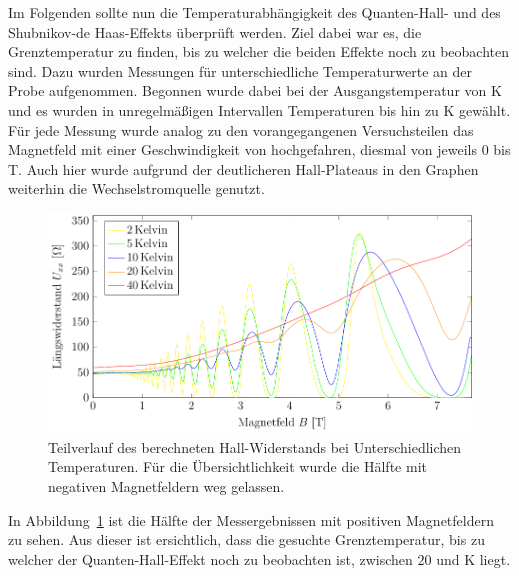 
Im Folgenden sollte nun die Temperaturabhängigkeit des Quanten-Hall- und des Shubnikov-de Haas-Effekts überprüft werden. Ziel dabei war es, die Grenztemperatur zu finden, bis zu welcher die beiden Effekte noch zu beobachten sind. 
Dazu wurden Messungen für unterschiedliche Temperaturwerte an der Probe aufgenommen. Begonnen wurde dabei bei der Ausgangstemperatur von \unit[2]{K} und es wurden in unregelmäßigen Intervallen Temperaturen bis hin zu \unit[40]{K} gewählt. Für jede Messung wurde analog zu den vorangegangenen Versuchsteilen das Magnetfeld mit einer Geschwindigkeit von  hochgefahren, diesmal von jeweils 0 bis \unit[7,7]{T}. Auch hier wurde aufgrund der deutlicheren Hall-Plateaus in den Graphen weiterhin die Wechselstromquelle genutzt.


\begin{figure}[h]
	\centering
	\includegraphics[scale=1]{graphs/temperatur/full_range.pdf}
	\caption[Hall-Widerstand unter Temperaturvariation]{
		Teilverlauf des berechneten Hall-Widerstands bei Unterschiedlichen Temperaturen. Für die Übersichtlichkeit wurde die Hälfte mit negativen Magnetfeldern weg gelassen.
	}
	\label{fig:temp_mess}
\end{figure}

In Abbildung~\ref{fig:temp_mess} ist die Hälfte der Messergebnissen mit positiven Magnetfeldern zu sehen. Aus dieser ist ersichtlich, dass die gesuchte Grenztemperatur, bis zu welcher der Quanten-Hall-Effekt noch zu beobachten ist, zwischen $20$ und \unit[40]{K} liegt.